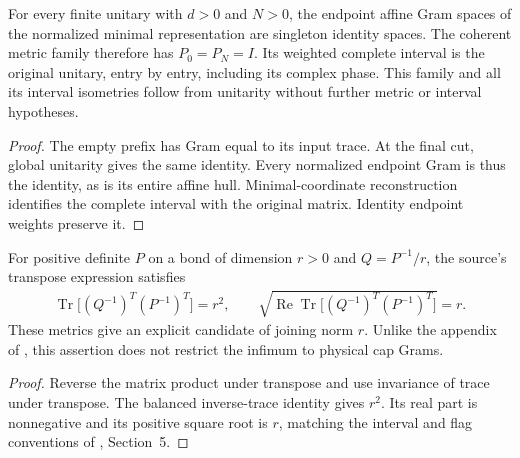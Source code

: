 \begin{lemma}
    \label{thm:mpu_normalized_minimal_interval_root}
    \leanok
    For every finite unitary with $d>0$ and $N>0$, the endpoint
    affine Gram spaces of the normalized minimal representation are
    singleton identity spaces. The coherent metric family therefore
    has $P_0=P_N=I$. Its weighted complete interval is the
    original unitary, entry by entry, including its complex phase.
    This family and all its interval isometries follow from
    unitarity without further metric or interval hypotheses.
\end{lemma}
\begin{proof}\leanok
    The empty prefix has Gram equal to its input trace. At the final
    cut, global unitarity gives the same identity. Every normalized
    endpoint Gram is thus the identity, as is its entire affine hull.
    Minimal-coordinate reconstruction identifies the complete interval
    with the original matrix. Identity endpoint weights preserve it.
\end{proof}

\begin{lemma}
    \label{thm:mpu_balanced_source_conditioning}
    \leanok
    For positive definite $P$ on a bond of dimension $r>0$ and
    $Q=P^{-1}/r$, the source's transpose expression satisfies
    \begin{align}
        \operatorname{Tr}\bigl[(Q^{-1})^T(P^{-1})^T\bigr]=r^2,
        \qquad
        \sqrt{\operatorname{Re}\operatorname{Tr}
            \bigl[(Q^{-1})^T(P^{-1})^T\bigr]}=r.
    \end{align}
    These metrics give an explicit candidate of joining norm $r$.
    Unlike the appendix of \cite{Styliaris2025MPUCircuits}, this
    assertion does not restrict the infimum to physical cap Grams.
\end{lemma}
\begin{proof}\leanok
    Reverse the matrix product under transpose and use invariance
    of trace under transpose. The balanced inverse-trace identity
    gives $r^2$. Its real part is nonnegative and its positive
    square root is $r$, matching the interval and flag conventions
    of \cite{RankTwoMPUCircuits2026}, Section~5.
\end{proof}

